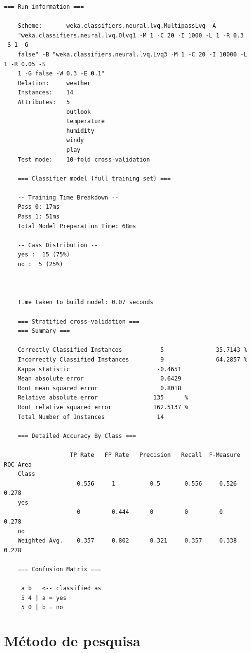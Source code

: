\vspace{1cm}
\begin{lstlisting}[caption=Exemplo de saída de uma execução do WEKA, label=lst:prop_weka_out]
    === Run information ===

    Scheme:       weka.classifiers.neural.lvq.MultipassLvq -A
    "weka.classifiers.neural.lvq.Olvq1 -M 1 -C 20 -I 1000 -L 1 -R 0.3 -S 1 -G
    false" -B "weka.classifiers.neural.lvq.Lvq3 -M 1 -C 20 -I 10000 -L 1 -R 0.05 -S
    1 -G false -W 0.3 -E 0.1"
    Relation:     weather
    Instances:    14
    Attributes:   5
                  outlook
                  temperature
                  humidity
                  windy
                  play
    Test mode:    10-fold cross-validation

    === Classifier model (full training set) ===

    -- Training Time Breakdown --
    Pass 0: 17ms
    Pass 1: 51ms
    Total Model Preparation Time: 68ms

    -- Cass Distribution --
    yes :  15 (75%)
    no :  5 (25%)



    Time taken to build model: 0.07 seconds

    === Stratified cross-validation ===
    === Summary ===

    Correctly Classified Instances           5               35.7143 %
    Incorrectly Classified Instances         9               64.2857 %
    Kappa statistic                         -0.4651
    Mean absolute error                      0.6429
    Root mean squared error                  0.8018
    Relative absolute error                135      %
    Root relative squared error            162.5137 %
    Total Number of Instances               14

    === Detailed Accuracy By Class ===

                   TP Rate   FP Rate   Precision   Recall  F-Measure   ROC Area
    Class
                     0.556     1          0.5       0.556     0.526      0.278
    yes
                     0         0.444      0         0         0          0.278
    no
    Weighted Avg.    0.357     0.802      0.321     0.357     0.338      0.278

    === Confusion Matrix ===

     a b   <-- classified as
     5 4 | a = yes
     5 0 | b = no
\end{lstlisting}

\section{Método de pesquisa}

